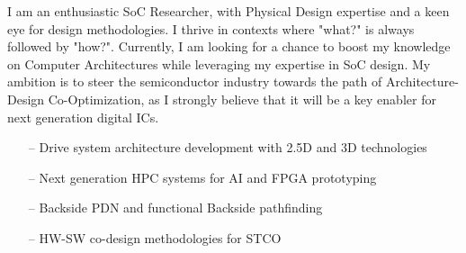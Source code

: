 \documentclass[10pt,a4paper,fancychapters]{altacv}
\begin{document}
%

\begin{fullwidth}
\makecvheader
{}
\justify 
\small{I am an enthusiastic SoC Researcher, with Physical Design expertise and a keen eye for design methodologies. I thrive in contexts where "what?" is always followed by "how?". Currently, I am looking for a chance to boost my knowledge on Computer Architectures while leveraging my expertise in SoC design. My ambition is to steer the semiconductor industry towards the path of  Architecture-Design Co-Optimization, as I strongly believe that it will be a key enabler for next generation digital ICs.}
\end{fullwidth}

%


\setlength{\itemindent}{0.5em}
\begin{itemize}
    \item[--] \small{Drive system architecture development with 2.5D and 3D technologies}
    \item[--] \small{Next generation HPC systems for AI and FPGA prototyping}
\end{itemize}


\begin{itemize}
    \setlength{\itemindent}{0.5em}
    \item[--] \small{Backside PDN and functional Backside pathfinding}
    \item[--] \small{HW-SW co-design methodologies for STCO}
\end{itemize}
\end{document}
